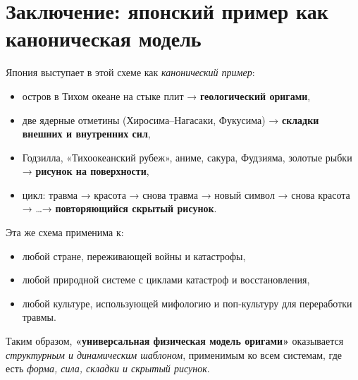 \documentclass[12pt]{article}
\begin{document}
\section{Заключение: японский пример как каноническая модель}

Япония выступает в этой схеме как \emph{канонический пример}:

\begin{itemize}
  \item остров в Тихом океане на стыке плит → \textbf{геологический оригами},
  \item две ядерные отметины (Хиросима–Нагасаки, Фукусима) → \textbf{складки внешних и внутренних сил},
  \item Годзилла, «Тихоокеанский рубеж», аниме, сакура, Фудзияма, золотые рыбки → \textbf{рисунок на поверхности},
  \item цикл: травма → красота → снова травма → новый символ → снова красота → \dots → \textbf{повторяющийся скрытый рисунок}.
\end{itemize}

Эта же схема применима к:

\begin{itemize}
  \item любой стране, переживающей войны и катастрофы,
  \item любой природной системе с циклами катастроф и восстановления,
  \item любой культуре, использующей мифологию и поп‑культуру для переработки травмы.
\end{itemize}

Таким образом, \textbf{«универсальная физическая модель оригами»} оказывается \emph{структурным и динамическим шаблоном}, применимым ко всем системам, где есть \emph{форма, сила, складки и скрытый рисунок}.
\end{document}
